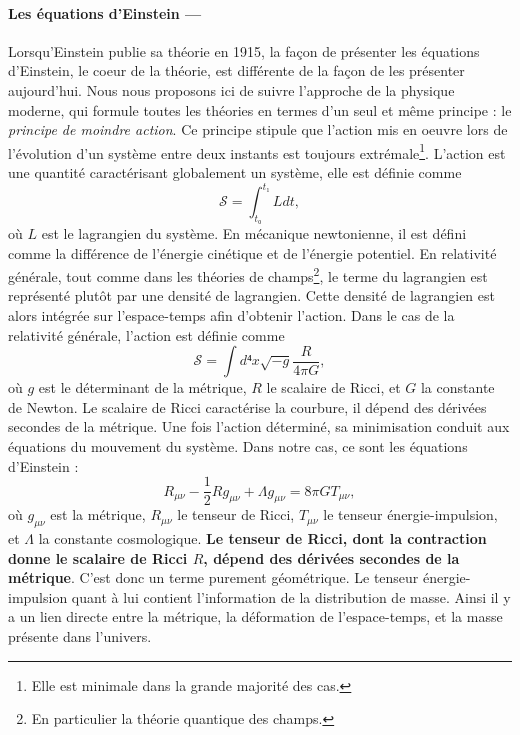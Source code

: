 \documentclass[11pt, twoside, a4paper, openright]{report}
\begin{document}
\paragraph{Les équations d'Einstein —}
Lorsqu'Einstein publie sa théorie en 1915, la façon de présenter les équations d'Einstein, le coeur de la théorie, est différente de la façon de les présenter aujourd'hui. Nous nous proposons ici de suivre l'approche de la physique moderne, qui formule toutes les théories en termes d'un seul et même principe : le \emph{principe de moindre action}. Ce principe stipule que l'action mis en oeuvre lors de l'évolution d'un système entre deux instants est toujours extrémale\footnote{Elle est minimale dans la grande majorité des cas.}. L'action est une quantité caractérisant globalement un système, elle est définie comme
\begin{equation}
  \label{eq:action}
  \mathcal{S} = \int_{t₀}^{t₁} L dt,
\end{equation}
où $L$ est le lagrangien du système. En mécanique newtonienne, il est défini comme la différence de l'énergie cinétique et de l'énergie potentiel. En relativité générale, tout comme dans les théories de champs\footnote{En particulier la théorie quantique des champs.}, le terme du lagrangien est représenté plutôt par une densité de lagrangien. Cette densité de lagrangien est alors intégrée sur l'espace-temps afin d'obtenir l'action. Dans le cas de la relativité générale, l'action est définie comme
\begin{equation}
  \label{eq:actionrg}
  \mathcal{S} = \int d⁴x \sqrt{-g} \frac{R}{4 \pi G} ,
\end{equation}
où $g$ est le déterminant de la métrique, $R$ le scalaire de Ricci, et $G$ la constante de Newton. Le scalaire de Ricci caractérise la courbure, il dépend des dérivées secondes de la métrique. Une fois l'action déterminé, sa minimisation conduit aux équations du mouvement du système. Dans notre cas, ce sont les équations d'Einstein :
\begin{equation}
  \label{eq:einstein}
  R_{\mu \nu} - \frac{1}{2} R g_{\mu \nu} + \Lambda g_{\mu \nu} = 8 \pi G T_{\mu \nu},
\end{equation}
où $g_{\mu \nu}$ est la métrique, $R_{\mu \nu}$ le tenseur de Ricci, $T_{\mu \nu}$ le tenseur énergie-impulsion, et $\Lambda$ la constante cosmologique. \textbf{Le tenseur de Ricci, dont la contraction donne le scalaire de Ricci $R$, dépend des dérivées secondes de la métrique}. C'est donc un terme purement géométrique. Le tenseur énergie-impulsion quant à lui contient l'information de la distribution de masse. Ainsi il y a un lien directe entre la métrique, la déformation de l'espace-temps, et la masse présente dans l'univers.
\end{document}
